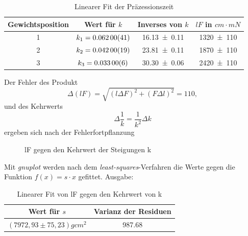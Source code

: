 \begin{table}[H]
  \centering
  \begin{tabular}{c | c | c | c}
    Gewichtsposition & Wert für $k$ & Inverses von $k$ & $lF$ in $cm\cdot mN$ \\ \hline
    1 & $k_1=\num{0,062\pm 0,00041}$ & \num{16,13\pm 0,11} & \num{1320 \pm 110}\\
    2 & $k_2=\num{0,042\pm0,00019}$ & \num{23,81\pm 0,11} & \num{1870 \pm 110}\\
    3 & $k_3=\num{0,033\pm 0,00006}$ & \num{30,30 \pm 0,06} & \num{2420 \pm 110}\\
  \end{tabular}
  \caption{Linearer Fit der Präzessionszeit}
  \label{tab:präzefit}
\end{table}
Der Fehler des Produkt 
\begin{equation}
\Delta (lF)= \sqrt{(l\Delta F)^2+(F \Delta l)^2}=110,
\end{equation}
und des Kehrwerts
\begin{equation}
\Delta \frac{1}{k}=\frac{1}{k^2}\Delta k
\end{equation}
ergeben sich nach der Fehlerfortpflanzung

\begin{figure}[H]
  \centering
  \caption{lF gegen den Kehrwert der Steigungen k}
  \label{fig:pos1}
\end{figure}
Mit \emph{gnuplot} werden nach dem \emph{least-squares}-Verfahren die Werte gegen die Funktion $f(x)=s\cdot x$ gefittet. Ausgabe:
\begin{table}[H]
  \centering
  \begin{tabular}{c | c}
     Wert für $s$ & Varianz der Residuen \\ \hline
     $(7972,93\pm 75,23)gcm^2$ & \num{987.68} 
  \end{tabular}
  \caption{Linearer Fit von lF gegen den Kehrwert von k}
  \label{tab:präzefit}
\end{table}

